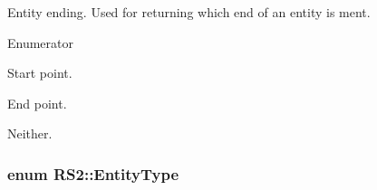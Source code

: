 Entity ending. Used for returning which end of an entity is ment. \begin{Desc}
\item[Enumerator]\par
\begin{description}
\item[{\em 
\hypertarget{classRS2_a30e80df2ef4bb36f4e89ea500eb212aba49f69cdcb5cc8c90b211d5f98631fe9d}{Ending\-Start}\label{classRS2_a30e80df2ef4bb36f4e89ea500eb212aba49f69cdcb5cc8c90b211d5f98631fe9d}
}]Start point. \item[{\em 
\hypertarget{classRS2_a30e80df2ef4bb36f4e89ea500eb212abaae7bf55673a9f4a36b86c1d1d975c8aa}{Ending\-End}\label{classRS2_a30e80df2ef4bb36f4e89ea500eb212abaae7bf55673a9f4a36b86c1d1d975c8aa}
}]End point. \item[{\em 
\hypertarget{classRS2_a30e80df2ef4bb36f4e89ea500eb212aba5ebf4600c052b2466c24af07d68bc900}{Ending\-None}\label{classRS2_a30e80df2ef4bb36f4e89ea500eb212aba5ebf4600c052b2466c24af07d68bc900}
}]Neither. \end{description}
\end{Desc}
\hypertarget{classRS2_a8f26d1b981e1e85cff16738b43337e6a}{
\subsubsection[{Entity\-Type}]{\setlength{\rightskip}{0pt plus 5cm}enum {\bf R\-S2\-::\-Entity\-Type}}}\label{classRS2_a8f26d1b981e1e85cff16738b43337e6a}
